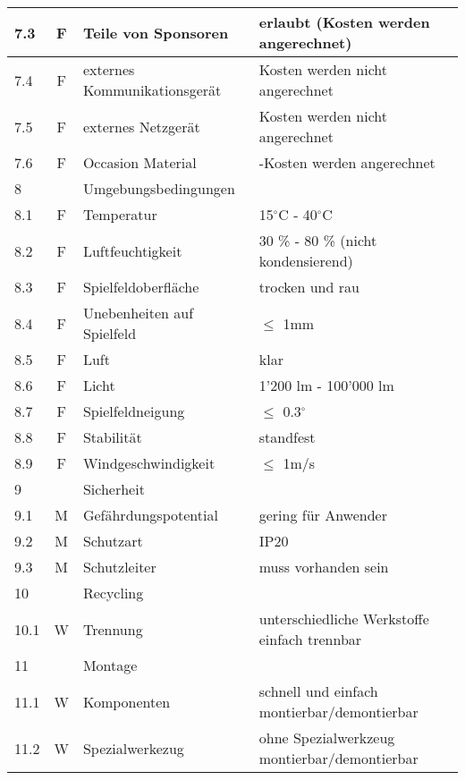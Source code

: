 \begin{longtable}[l]{|l|c|l|X|}
	\hline 7.3 & F & Teile von Sponsoren & erlaubt (Kosten werden angerechnet) \\
	\hline 7.4 & F & externes Kommunikationsgerät & Kosten werden nicht angerechnet \\
	\hline 7.5 & F & externes Netzgerät & Kosten werden nicht angerechnet \\
	\hline 7.6 & F & Occasion Material & \textonehalf-Kosten werden angerechnet \\
	\hline 8 &  & Umgebungsbedingungen & \\
	\hline 8.1 & F & Temperatur & 15$^\circ$C - 40$^\circ$C \\
	\hline 8.2 & F & Luftfeuchtigkeit & 30 \% - 80 \% (nicht kondensierend) \\
	\hline 8.3 & F & Spielfeldoberfläche & trocken und rau \\
	\hline 8.4 & F & Unebenheiten auf Spielfeld & $\leq$ 1mm \\
	\hline 8.5 & F & Luft & klar \\
	\hline 8.6 & F & Licht & 1'200 lm - 100'000 lm \\
	\hline 8.7 & F & Spielfeldneigung & $\leq$ 0.3$^\circ$ \\
	\hline 8.8 & F & Stabilität & standfest \\
	\hline 8.9 & F & Windgeschwindigkeit & $\leq$ 1m/s \\
	\hline 9 &  & Sicherheit & \\
	\hline 9.1 & M & Gefährdungspotential & gering für Anwender \\
	\hline 9.2 & M & Schutzart & IP20 \\
	\hline 9.3 & M & Schutzleiter & muss vorhanden sein \\
	\hline 10 &  & Recycling & \\
	\hline 10.1 & W & Trennung & unterschiedliche Werkstoffe einfach trennbar \\
	\hline 11 &  & Montage & \\
	\hline 11.1 & W & Komponenten & schnell und einfach montierbar/demontierbar \\
	\hline 11.2 & W & Spezialwerkezug & ohne Spezialwerkzeug montierbar/demontierbar \\
	\hline 
\end{longtable}